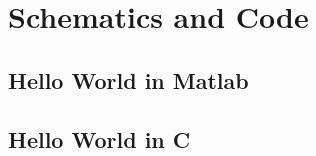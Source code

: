 \label{ch:appendix}

\chapter{Schematics and Code}
\label{ch:appendix-code}

\newpage

\section{Hello World in Matlab}
\label{code:hello-world.m}

\newpage

\section{Hello World in C}
\label{code:hello-world.c}

\newpage
